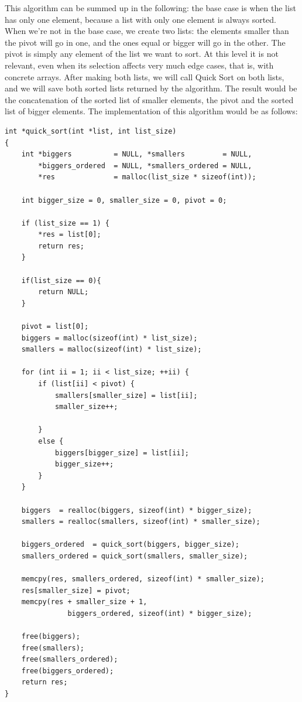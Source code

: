\documentclass[a4paper]{article}
\begin{document}
This algorithm can be summed up in the following: the base case is when the list
has only one element, because a list with only one element is always sorted.
When we're not in the base case, we create two lists: the elements smaller than
the pivot will go in one, and the ones equal or bigger will go in the other.
The pivot is simply any element of the list we want to sort. At this level it is
not relevant, even when its selection affects very much edge cases, that is,
with concrete arrays. After making both lists, we will call Quick Sort on both
lists, and we will save both sorted lists returned by the algorithm. The result
would be the concatenation of the sorted list of smaller elements, the pivot and
the sorted list of bigger elements.
The implementation of this algorithm would be as follows:

\noindent
\begin{minipage}[H]{\linewidth}
\mbox{}
\begin{lstlisting}[style=C,
caption={Implementation of Quick Sort},
label={lst:quick_sort}]
int *quick_sort(int *list, int list_size)
{
    int *biggers          = NULL, *smallers         = NULL,
        *biggers_ordered  = NULL, *smallers_ordered = NULL,
        *res              = malloc(list_size * sizeof(int));

    int bigger_size = 0, smaller_size = 0, pivot = 0;

    if (list_size == 1) {
        *res = list[0];
        return res;
    }

    if(list_size == 0){
        return NULL;
    }

    pivot = list[0];
    biggers = malloc(sizeof(int) * list_size);
    smallers = malloc(sizeof(int) * list_size);

    for (int ii = 1; ii < list_size; ++ii) {
        if (list[ii] < pivot) {
            smallers[smaller_size] = list[ii];
            smaller_size++;

        }
        else {
            biggers[bigger_size] = list[ii];
            bigger_size++;
        }
    }

    biggers  = realloc(biggers, sizeof(int) * bigger_size);
    smallers = realloc(smallers, sizeof(int) * smaller_size);

    biggers_ordered  = quick_sort(biggers, bigger_size);
    smallers_ordered = quick_sort(smallers, smaller_size);

    memcpy(res, smallers_ordered, sizeof(int) * smaller_size);
    res[smaller_size] = pivot;
    memcpy(res + smaller_size + 1,
               biggers_ordered, sizeof(int) * bigger_size);

    free(biggers);
    free(smallers);
    free(smallers_ordered);
    free(biggers_ordered);
    return res;
}
\end{lstlisting}
\end{minipage}
\end{document}
